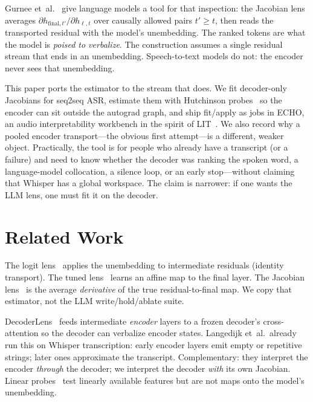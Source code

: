 \documentclass[conference]{IEEEtran}
\begin{document}
Gurnee et~al.~\cite{gurnee2026workspace} give language models a tool for that inspection: the Jacobian lens averages \(\partial h_{\mathrm{final},t'}/\partial h_{\ell,t}\) over causally allowed pairs \(t'\ge t\), then reads the transported residual with the model's unembedding. The ranked tokens are what the model is \emph{poised to verbalize}. The construction assumes a single residual stream that ends in an unembedding. Speech-to-text models do not: the encoder never sees that unembedding.

This paper ports the estimator to the stream that does. We fit decoder-only Jacobians for seq2seq ASR, estimate them with Hutchinson probes~\cite{hutchinson1989trace} so the encoder can sit outside the autograd graph, and ship fit/apply as jobs in ECHO, an audio interpretability workbench in the spirit of LIT~\cite{tenney2020lit}. We also record why a pooled encoder transport---the obvious first attempt---is a different, weaker object. Practically, the tool is for people who already have a transcript (or a failure) and need to know whether the decoder was ranking the spoken word, a language-model collocation, a silence loop, or an early stop---without claiming that Whisper has a global workspace. The claim is narrower: if one wants the LLM lens, one must fit it on the decoder.

\section{Related Work}

The logit lens~\cite{nostalgebraist2020logitlens} applies the unembedding to intermediate residuals (identity transport). The tuned lens~\cite{belrose2023tuned} learns an affine map to the final layer. The Jacobian lens~\cite{gurnee2026workspace} is the average \emph{derivative} of the true residual-to-final map. We copy that estimator, not the LLM write/hold/ablate suite.

DecoderLens~\cite{langedijk2024decoderlens} feeds intermediate \emph{encoder} layers to a frozen decoder's cross-attention so the decoder can verbalize encoder states. Langedijk et~al.\ already run this on Whisper transcription: early encoder layers emit empty or repetitive strings; later ones approximate the transcript. Complementary: they interpret the encoder \emph{through} the decoder; we interpret the decoder \emph{with} its own Jacobian. Linear probes~\cite{alain2017probes,hewitt2019structural,belinkov2022probing} test linearly available features but are not maps onto the model's unembedding.
\end{document}
